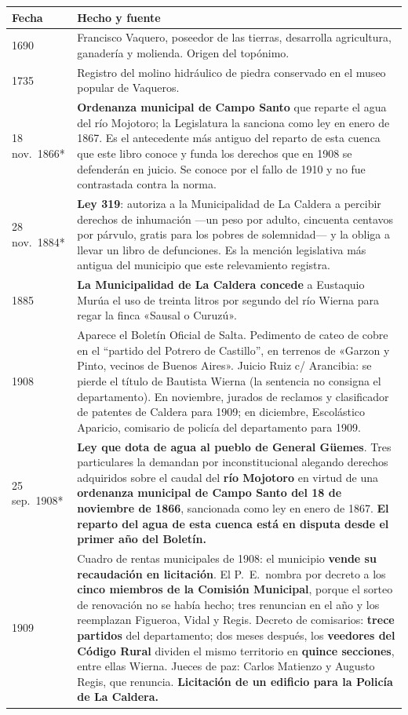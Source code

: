 \begin{longtable}{@{}p{2.7cm}p{10.3cm}@{}}
\toprule
\textbf{Fecha} & \textbf{Hecho y fuente} \\
\midrule
\endhead
1690 & Francisco Vaquero, poseedor de las tierras, desarrolla agricultura, ganadería y molienda. Origen del topónimo. \\
1735 & Registro del molino hidráulico de piedra conservado en el museo popular de Vaqueros. \\
18 nov.\ 1866* & \textbf{Ordenanza municipal de Campo Santo} que reparte el agua del río Mojotoro; la Legislatura la sanciona como ley en enero de 1867. Es el antecedente más antiguo del reparto de esta cuenca que este libro conoce y funda los derechos que en 1908 se defenderán en juicio. Se conoce por el fallo de 1910 y no fue contrastada contra la norma. \\
28 nov.\ 1884* & \textbf{Ley 319}: autoriza a la Municipalidad de La Caldera a percibir derechos de inhumación ---un peso por adulto, cincuenta centavos por párvulo, gratis para los pobres de solemnidad--- y la obliga a llevar un libro de defunciones. Es la mención legislativa más antigua del municipio que este relevamiento registra. \\
1885 & \textbf{La Municipalidad de La Caldera concede} a Eustaquio Murúa el uso de treinta litros por segundo del río Wierna para regar la finca «Sausal o Curuzú». \\
1908 & Aparece el Boletín Oficial de Salta. Pedimento de cateo de cobre en el ``partido del Potrero de Castillo'', en terrenos de «Garzon y Pinto, vecinos de Buenos Aires». Juicio Ruiz c/ Arancibia: se pierde el título de Bautista Wierna (la sentencia no consigna el departamento). En noviembre, jurados de reclamos y clasificador de patentes de Caldera para 1909; en diciembre, Escolástico Aparicio\index{Aparicio, Escolástico M.}, comisario de policía del departamento para 1909. \\
25 sep.\ 1908* & \textbf{Ley que dota de agua al pueblo de General Güemes}. Tres particulares la demandan por inconstitucional alegando derechos adquiridos sobre el caudal del \textbf{río Mojotoro} en virtud de una \textbf{ordenanza municipal de Campo Santo del 18 de noviembre de 1866}, sancionada como ley en enero de 1867. \textbf{El reparto del agua de esta cuenca está en disputa desde el primer año del Boletín.} \\
1909 & Cuadro de rentas municipales de 1908: el municipio \textbf{vende su recaudación en licitación}. El P.\ E.\ nombra por decreto a los \textbf{cinco miembros de la Comisión Municipal}, porque el sorteo de renovación no se había hecho; tres renuncian en el año y los reemplazan Figueroa\index{Figueroa, Abelardo}, Vidal y Regis\index{Regis, Augusto}. Decreto de comisarios: \textbf{trece partidos} del departamento; dos meses después, los \textbf{veedores del Código Rural} dividen el mismo territorio en \textbf{quince secciones}, entre ellas Wierna. Jueces de paz: Carlos Matienzo y Augusto Regis\index{Regis, Augusto}, que renuncia. \textbf{Licitación de un edificio para la Policía de La Caldera.} \\

\end{longtable}
